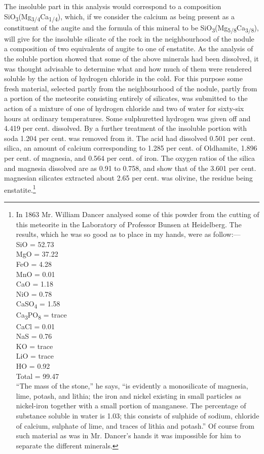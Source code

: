 \documentclass[a4paper, 12pt, oneside]{article}
\begin{document}
The insoluble part in this analysis would correspond to a composition SiO\textsubscript{3}(Mg\textsubscript{3/4}Ca\textsubscript{1/4}), which, if we consider the calcium as being present as a constituent of the augite and the formula of this mineral to be SiO\textsubscript{3}(Mg\textsubscript{5/8}Ca\textsubscript{3/8}), will give for the insoluble silicate of the rock in the neighbourhood of the nodule a composition of two equivalents of augite to one of enstatite. As the analysis of the soluble portion showed that some of the above minerals had been dissolved, it was thought advisable to determine what and how much of them were rendered soluble by the action of hydrogen chloride in the cold. For this purpose some fresh material, selected partly from the neighbourhood of the nodule, partly from a portion of the meteorite consisting entirely of silicates, was submitted to the action of a mixture of one of hydrogen chloride and two of water for sixty-six hours at ordinary temperatures. Some sulphuretted hydrogen was given off and 4.419 per cent. dissolved. By a further treatment of the insoluble portion with soda 1.204 per cent. was removed from it. The acid had dissolved 0.501 per cent. silica, an amount of calcium corresponding to 1.285 per cent. of Oldhamite, 1.896 per cent. of magnesia, and 0.564 per cent. of iron. The oxygen ratios of the silica and magnesia dissolved are as 0.91 to 0.758, and show that of the 3.601 per cent. magnesian silicates extracted about 2.65 per cent. was olivine, the residue being enstatite.\footnote{In 1863 Mr. William Dancer analysed some of this powder from the cutting of this meteorite in the Laboratory of Professor Bunsen at Heidelberg.  
The results, which he was so good as to place in my hands, were as follow:---\\
SiO = 52.73\\
MgO = 37.22\\
FeO = 4.28\\
MnO = 0.01\\
CaO = 1.18\\
NiO = 0.78\\
CaSO\textsubscript{4} = 1.58\\
Ca\textsubscript{3}PO\textsubscript{8} = trace\\
CaCl = 0.01\\
NaS = 0.76\\
KO = trace\\
LiO = trace\\
HO = 0.92\\
Total = 99.47\\
``The mass of the stone,'' he says, ``is evidently a monosilicate of magnesia, lime, potash, and lithia; the iron and nickel existing in small particles as nickel-iron together with a small portion of manganese. The percentage of substance soluble in water is 1.03; this consists of sulphide of sodium, chloride of calcium, sulphate of lime, and traces of lithia and potash.'' Of course from such material as was in Mr. Dancer's hands it was impossible for him to separate the different minerals.}
\end{document}
